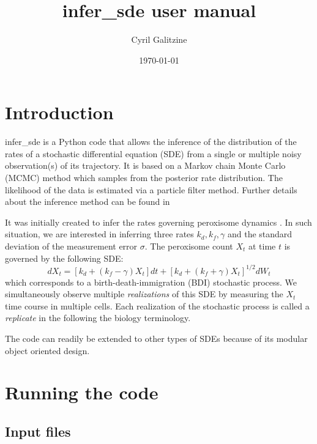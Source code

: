 \documentclass[]{article}   %
\begin{document}
\title{infer\_sde user manual}   %
\author{Cyril Galitzine}         %
\date{\today}    %
\maketitle


\section{Introduction}     %

infer\_sde is a Python code that allows the inference of the distribution of the rates of a stochastic differential equation (SDE) from a single or multiple noisy observation(s) of its trajectory. It is based on a Markov chain Monte Carlo (MCMC) method which samples from the posterior rate distribution. The likelihood of the data is estimated via a particle filter method. Further details about the inference method can be found in \cite{Galitzine}

 It was initially created to infer the rates governing peroxisome dynamics \cite{Galitzine}. In such situation, we are interested in inferring three rates $k_{d}, k_{f}, \gamma$ and the standard deviation of the measurement error $\sigma$. The peroxisome count $X_{t}$ at time $t$ is governed by the following SDE:
\begin{equation}
d X_{t} = \left[k_{d} + \left(k_{f} - \gamma\right) X_{t} \right] dt + \left[k_{d} + \left(k_{f} + \gamma\right) X_{t} \right]^{1/2} d W_{t}
\label{BDI} 
\end{equation}
which corresponds to a birth-death-immigration (BDI) stochastic process.
We simultaneously observe multiple \emph{realizations} of this SDE by measuring the $X_{t}$ time course in multiple cells. Each realization of the stochastic process is called a \emph{replicate} in the following the biology terminology.

The code can readily be extended to other types of SDEs because of its modular object oriented design.

\section{Running the code}     %
\subsection{Input files}    
\end{document}
